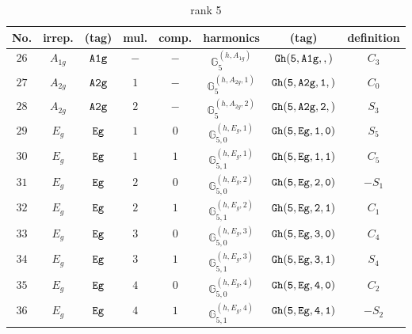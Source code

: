 \documentclass[fleqn,8pt]{jsarticle}
\begin{document}
\begin{table}[ht!]
\begin{center}
\caption{rank 5}
\renewcommand{\arraystretch}{1.3}
\begin{tabular}{cccccccc} \hline \hline
No. & irrep. & (tag) & mul. & comp. & harmonics & (tag) & definition \\ \hline
$ 26 $ & $ A_{1g} $ & $ {\tt A1g} $ & $ - $ & $ - $ & $ \mathbb{G}_{5}^{(h,A_{1g})} $ & $ {\tt Gh(5,A1g,,)} $ & $ C_{3} $ \\
$ 27 $ & $ A_{2g} $ & $ {\tt A2g} $ & $ 1 $ & $ - $ & $ \mathbb{G}_{5}^{(h,A_{2g},1)} $ & $ {\tt Gh(5,A2g,1,)} $ & $ C_{0} $ \\
$ 28 $ & $ A_{2g} $ & $ {\tt A2g} $ & $ 2 $ & $ - $ & $ \mathbb{G}_{5}^{(h,A_{2g},2)} $ & $ {\tt Gh(5,A2g,2,)} $ & $ S_{3} $ \\
$ 29 $ & $ E_{g} $ & $ {\tt Eg} $ & $ 1 $ & $ 0 $ & $ \mathbb{G}_{5,0}^{(h,E_{g},1)} $ & $ {\tt Gh(5,Eg,1,0)} $ & $ S_{5} $ \\
$ 30 $ & $ E_{g} $ & $ {\tt Eg} $ & $ 1 $ & $ 1 $ & $ \mathbb{G}_{5,1}^{(h,E_{g},1)} $ & $ {\tt Gh(5,Eg,1,1)} $ & $ C_{5} $ \\
$ 31 $ & $ E_{g} $ & $ {\tt Eg} $ & $ 2 $ & $ 0 $ & $ \mathbb{G}_{5,0}^{(h,E_{g},2)} $ & $ {\tt Gh(5,Eg,2,0)} $ & $ - S_{1} $ \\
$ 32 $ & $ E_{g} $ & $ {\tt Eg} $ & $ 2 $ & $ 1 $ & $ \mathbb{G}_{5,1}^{(h,E_{g},2)} $ & $ {\tt Gh(5,Eg,2,1)} $ & $ C_{1} $ \\
$ 33 $ & $ E_{g} $ & $ {\tt Eg} $ & $ 3 $ & $ 0 $ & $ \mathbb{G}_{5,0}^{(h,E_{g},3)} $ & $ {\tt Gh(5,Eg,3,0)} $ & $ C_{4} $ \\
$ 34 $ & $ E_{g} $ & $ {\tt Eg} $ & $ 3 $ & $ 1 $ & $ \mathbb{G}_{5,1}^{(h,E_{g},3)} $ & $ {\tt Gh(5,Eg,3,1)} $ & $ S_{4} $ \\
$ 35 $ & $ E_{g} $ & $ {\tt Eg} $ & $ 4 $ & $ 0 $ & $ \mathbb{G}_{5,0}^{(h,E_{g},4)} $ & $ {\tt Gh(5,Eg,4,0)} $ & $ C_{2} $ \\
$ 36 $ & $ E_{g} $ & $ {\tt Eg} $ & $ 4 $ & $ 1 $ & $ \mathbb{G}_{5,1}^{(h,E_{g},4)} $ & $ {\tt Gh(5,Eg,4,1)} $ & $ - S_{2} $ \\
 \hline \hline
\end{tabular}
\end{center}
\end{table}
\end{document}
